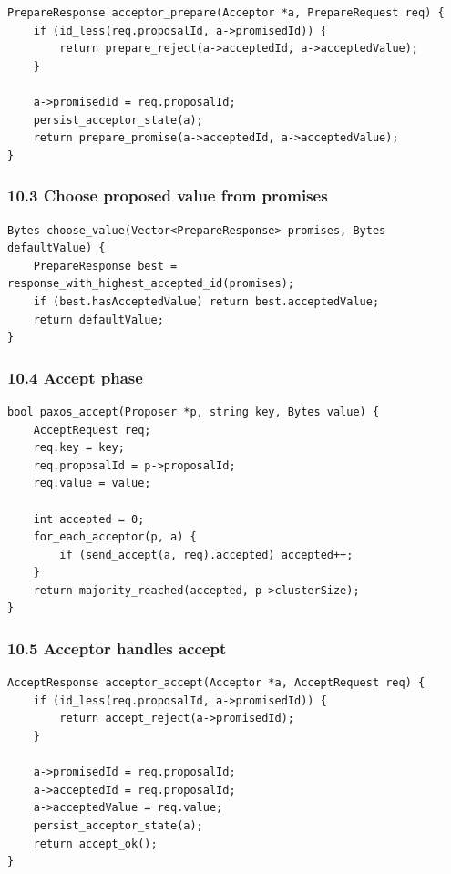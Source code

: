 \documentclass[10pt,letterpaper]{article}
\begin{document}
\begin{verbatim}
PrepareResponse acceptor_prepare(Acceptor *a, PrepareRequest req) {
    if (id_less(req.proposalId, a->promisedId)) {
        return prepare_reject(a->acceptedId, a->acceptedValue);
    }

    a->promisedId = req.proposalId;
    persist_acceptor_state(a);
    return prepare_promise(a->acceptedId, a->acceptedValue);
}
\end{verbatim}

\subsubsection*{10.3 Choose proposed value from promises}

\begin{verbatim}
Bytes choose_value(Vector<PrepareResponse> promises, Bytes defaultValue) {
    PrepareResponse best = response_with_highest_accepted_id(promises);
    if (best.hasAcceptedValue) return best.acceptedValue;
    return defaultValue;
}
\end{verbatim}

\subsubsection*{10.4 Accept phase}

\begin{verbatim}
bool paxos_accept(Proposer *p, string key, Bytes value) {
    AcceptRequest req;
    req.key = key;
    req.proposalId = p->proposalId;
    req.value = value;

    int accepted = 0;
    for_each_acceptor(p, a) {
        if (send_accept(a, req).accepted) accepted++;
    }
    return majority_reached(accepted, p->clusterSize);
}
\end{verbatim}

\subsubsection*{10.5 Acceptor handles accept}

\begin{verbatim}
AcceptResponse acceptor_accept(Acceptor *a, AcceptRequest req) {
    if (id_less(req.proposalId, a->promisedId)) {
        return accept_reject(a->promisedId);
    }

    a->promisedId = req.proposalId;
    a->acceptedId = req.proposalId;
    a->acceptedValue = req.value;
    persist_acceptor_state(a);
    return accept_ok();
}
\end{verbatim}
\end{document}
